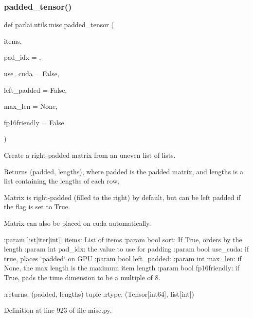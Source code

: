 \subsubsection{\texorpdfstring{padded\+\_\+tensor()}{padded\_tensor()}}
{\footnotesize\ttfamily def parlai.\+utils.\+misc.\+padded\+\_\+tensor (\begin{DoxyParamCaption}\item[{}]{items,  }\item[{}]{pad\+\_\+idx = {},  }\item[{}]{use\+\_\+cuda = {\ttfamily False},  }\item[{}]{left\+\_\+padded = {\ttfamily False},  }\item[{}]{max\+\_\+len = {\ttfamily None},  }\item[{}]{fp16friendly = {\ttfamily False} }\end{DoxyParamCaption})}

\begin{DoxyVerb}Create a right-padded matrix from an uneven list of lists.

Returns (padded, lengths), where padded is the padded matrix, and lengths
is a list containing the lengths of each row.

Matrix is right-padded (filled to the right) by default, but can be
left padded if the flag is set to True.

Matrix can also be placed on cuda automatically.

:param list[iter[int]] items: List of items
:param bool sort: If True, orders by the length
:param int pad_idx: the value to use for padding
:param bool use_cuda: if true, places `padded` on GPU
:param bool left_padded:
:param int max_len: if None, the max length is the maximum item length
:param bool fp16friendly: if True, pads the time dimension to be a multiple of 8.

:returns: (padded, lengths) tuple
:rtype: (Tensor[int64], list[int])
\end{DoxyVerb}
 

Definition at line 923 of file misc.\+py.


